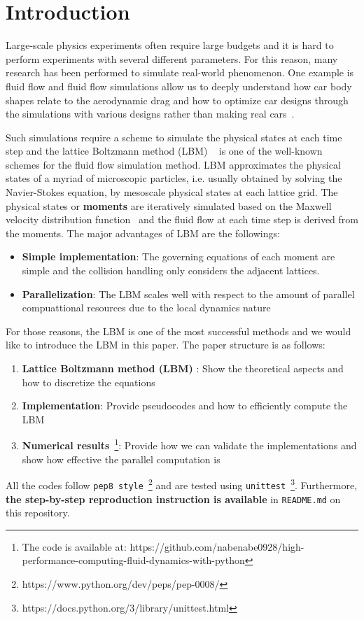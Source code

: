\chapter{Introduction}
\vspace{-8mm}
Large-scale physics experiments often require large budgets
and it is hard to perform experiments with several different parameters.
For this reason, many research has been performed to simulate real-world 
phenomenon.
One example is fluid flow and
fluid flow simulations allow us to deeply understand
how car body shapes relate to the aerodynamic drag
and how to optimize car designs through the simulations with
various designs rather than making real cars~\cite{padagannavar2016automotive}.

Such simulations require a scheme to simulate the physical states
at each time step
and the lattice Boltzmann method (LBM) ~\cite{timm2016lattice}
is one of the well-known
schemes for the fluid flow simulation method.
LBM approximates the physical states of a myriad of microscopic particles,
i.e. usually obtained by solving the Navier-Stokes equation,
by mesoscale physical states at each lattice grid.
The physical states or {\bf moments} are iteratively simulated based on
the Maxwell velocity distribution function~\cite{huang1963statistical} and
the fluid flow at each time step is derived from the moments.
The major advantages of LBM are the followings:
\begin{itemize}
  \item {\bf Simple implementation}: The governing equations of each moment
  are simple and the collision handling only considers the adjacent lattices. 
  \item {\bf Parallelization}: The LBM scales well with respect to
  the amount of parallel compuattional resources due to
  the local dynamics nature~\cite{raabe2004overview}
\end{itemize}
For those reasons, the LBM is one of the most successful methods and
we would like to introduce the LBM in this paper.
The paper structure is as follows:
\begin{enumerate}
  \item {\bf Lattice Boltzmann method (LBM) }: Show the theoretical aspects and
  how to discretize the equations
  \item {\bf Implementation}:
  Provide pseudocodes and how to efficiently compute
  the LBM
  \item {\bf Numerical results}~\footnote{
  The code is available at:
    https://github.com/nabenabe0928/high-performance-computing-fluid-dynamics-with-python
  }: Provide how we can validate the implementations
  and show how effective the parallel computation is
\end{enumerate}
All the codes follow {\tt pep8 style}~\footnote{https://www.python.org/dev/peps/pep-0008/} and 
are tested using
{\tt unittest}~\footnote{https://docs.python.org/3/library/unittest.html}.
Furthermore, {\bf the step-by-step reproduction instruction is available}
in {\tt README.md} on this repository.
